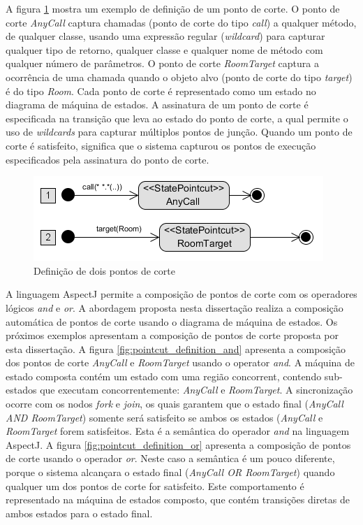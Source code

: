 A figura \ref{fig:pointcut_definition_1} mostra um exemplo de definição de um ponto de corte. O ponto de corte \textit{AnyCall} captura chamadas
(ponto de corte do tipo \textit{call}) a qualquer método, de qualquer classe, usando uma expressão regular (\textit{wildcard}) para capturar qualquer
tipo de retorno, qualquer classe e qualquer nome de método com qualquer número de parâmetros. O ponto de corte \textit{RoomTarget} captura a ocorrência de uma chamada
quando o objeto alvo (ponto de corte do tipo \textit{target}) é do tipo \textit{Room}. Cada ponto de corte é representado como um estado no diagrama
de máquina de estados. A assinatura de um ponto de corte é especificada na transição que leva ao estado do ponto de corte, a qual permite o uso de
\textit{wildcards} para capturar múltiplos pontos de junção. Quando um ponto de corte é satisfeito, significa que o sistema capturou os pontos de execução 
especificados pela assinatura do ponto de corte.

\begin{figure}[h]
	\centering
	\includegraphics{img/pointcut_definition_1.png}
	\caption{Definição de dois pontos de corte}\label{fig:pointcut_definition_1}
\end{figure}

A linguagem AspectJ permite a composição de pontos de corte com os operadores lógicos \textit{and} e \textit{or}. A abordagem proposta nesta
dissertação realiza a composição automática de pontos de corte usando o diagrama de máquina de estados. Os próximos exemplos apresentam a composição
de pontos de corte proposta por esta dissertação. A figura \ref{fig:pointcut_definition_and} apresenta a composição dos pontos de corte
\textit{AnyCall} e \textit{RoomTarget} usando o operator \textit{and}. A máquina de estado composta contém um estado com uma região concorrent, contendo 
sub-estados que executam concorrentemente: \textit{AnyCall} e \textit{RoomTarget}. A sincronização ocorre com os nodos \textit{fork} e \textit{join}, 
os quais garantem que o estado final (\textit{AnyCall AND RoomTarget}) somente será satisfeito se ambos os estados (\textit{AnyCall} e \textit{RoomTarget} 
forem satisfeitos. Esta é a semântica do operador \textit{and} na linguagem AspectJ. A figura
\ref{fig:pointcut_definition_or} apresenta a composição de pontos de corte usando o operador \textit{or}. Neste caso a semântica é um pouco diferente,
porque o sistema alcançara o estado final (\textit{AnyCall OR RoomTarget}) quando qualquer um dos pontos de corte for satisfeito. Este comportamento é
representado na máquina de estados composto, que contém transições diretas de ambos estados para o estado final.

